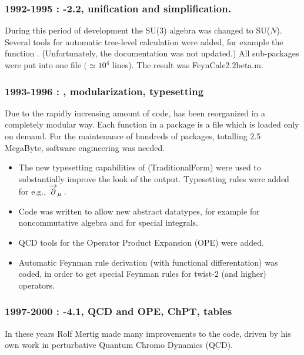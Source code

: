 \subsubsection*{1992-1995 : -2.2, unification and simplification.}

During this period of development the SU(3) algebra was changed to SU($N$). Several tools for automatic tree-level calculation were added, for example the function . (Unfortunately, the  documentation was not updated.) All sub-packages were put into one file \(\big(\simeq {{10}^4}\) lines). The result was FeynCalc2.2beta.m.

\subsubsection*{1993-1996 : , modularization, typesetting}

Due to the rapidly increasing amount of code, \fc has been reorganized in a completely modular way. Each function in a package is a file which is loaded only on demand. For the maintenance of hundreds of packages, totalling 2.5 MegaByte, software engineering was needed.

\begin{itemize}

\item The new typesetting capabilities of  (TraditionalForm) were used to substantially improve the look of the output. Typesetting rules were added for e.g., \({\overvar{\partial }{\rightarrow}}_{\mu } \multsp \).

\item Code was written to allow new abstract datatypes, for example for noncommutative algebra and for special integrals.

\item QCD tools for the Operator Product Expansion  (OPE)
were added.

\item Automatic Feynman rule derivation (with functional
differentation) was coded, in order to get special Feynman rules
for twist-2 (and higher) operators.

\end{itemize}

\subsubsection*{1997-2000 : -4.1, QCD and OPE, ChPT, tables}

In these years Rolf Mertig made many improvements to the code, driven by his own work in perturbative Quantum Chromo Dynamics (QCD).


